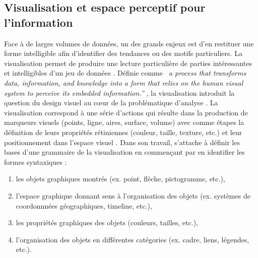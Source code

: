 \subsection[Visualisation et espace perceptif pour l{\textquoteright}information]{Visualisation et espace perceptif pour l{\textquoteright}information}

Face à de larges volumes de données, un des grands enjeux est d{\textquoteright}en restituer une forme intelligible afin d{\textquoteright}identifier des tendances ou des motifs particuliers. La visualisation permet de produire une lecture particulière de parties intéressantes et intelligibles d{\textquoteright}un jeu de données \citep{Cairo2013}. Définie comme \textit{{\guillemotleft}~a process that transforms data, information, and knowledge into a form that relies on the human visual system to perceive its embedded information.{\textquotedblright}} \citep{Graffieti2010}, la visualisation introduit la question du design visuel au c{\oe}ur de la problématique d{\textquoteright}analyse \citep{Wesolowsky1992}. La visualisation correspond à une série d{\textquoteright}actions qui résulte dans la production de marqueurs visuels (points, ligne, aires, surface, volume) avec comme étapes la définition de leurs propriétés rétiniennes (couleur, taille, texture, etc.) et leur positionnement dans l{\textquoteright}espace visuel \citep{Card1997}. Dans son travail, \cite{Engelhardt2007} s’attache à définir les bases d{\textquoteright}une grammaire de la visualisation en commen\c{c}ant par en identifier les formes syntaxiques :  

\begin{enumerate}
    \item les objets graphiques montrés (ex. point, flèche, pictogramme, etc.), 
    \item l{\textquoteright}espace graphique donnant sens à l{\textquoteright}organisation des objets (ex. systèmes de coordonnnées géographiques, timeline, etc.), 
    \item les propriétés graphiques des objets (couleurs, tailles, etc.), 
    \item l{\textquoteright}organisation des objets en différentes catégories (ex. cadre, liens, légendes, etc.). 
\end{enumerate}

